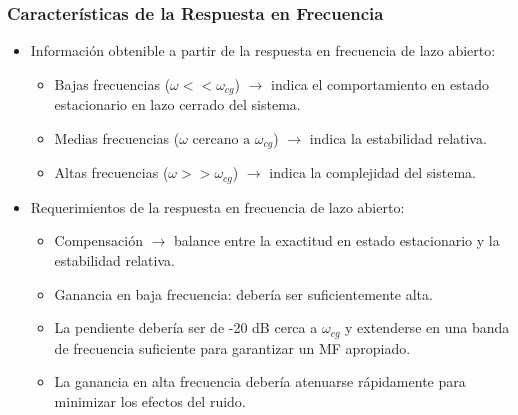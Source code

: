 \documentclass[aspectratio=169, handout]{beamer}
\theoremstyle{definition}
\theoremstyle{plain}
\theoremstyle{remark}
\begin{document}
\begin{frame}[<+->]\frametitle{Características de la Respuesta en Frecuencia}
\begin{itemize}
	\item Información obtenible a partir de la respuesta en frecuencia de lazo abierto:
	\begin{itemize}
		\item Bajas frecuencias ($\omega << \omega_{cg}$) $\rightarrow$ indica el comportamiento en estado estacionario en lazo cerrado del sistema.
		\item Medias frecuencias ($\omega \text{ cercano a } \omega_{cg}$) $\rightarrow$ indica la estabilidad relativa.
		\item Altas frecuencias ($\omega >> \omega_{cg}$) $\rightarrow$ indica la complejidad del sistema.
	\end{itemize}
	\item Requerimientos de la respuesta en frecuencia de lazo abierto:
	\begin{itemize}
		\item Compensación $\rightarrow$ balance entre la exactitud en estado estacionario y la estabilidad relativa.
		\item Ganancia en baja frecuencia: debería ser suficientemente alta.
		\item La pendiente debería ser de -20 dB cerca a $\omega_{cg}$ y extenderse en una banda de frecuencia suficiente para garantizar un MF apropiado.
		\item La ganancia en alta frecuencia debería atenuarse rápidamente para minimizar los efectos del ruido.
	\end{itemize}
\end{itemize}
\end{frame}
\end{document}
